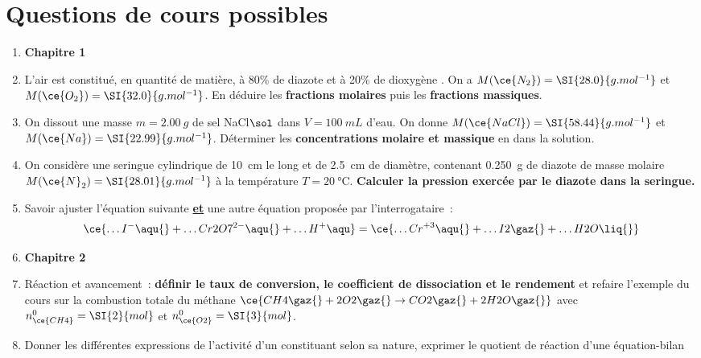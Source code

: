 \documentclass[a4paper, 12pt, final, garamond]{book}
\begin{document}
\section{Questions de cours possibles}
\begin{enumerate}
	\item[] \textbf{Chapitre 1}
	\item L'air est constitué, en quantité de matière, à 80\% de diazote  et
	      à 20\% de dioxygène .
	      \smallbreak
	      On a
	      $M(\ce{N_2}) = \SI{28.0}{g.mol^{-1}}$ et
	      $M(\ce{O_2}) = \SI{32.0}{g.mol^{-1}}$.
	      \smallbreak
	      En déduire les \textbf{fractions molaires} puis les \textbf{fractions
		      massiques}.
	\item On dissout une masse $m = \SI{2.00}{g}$ de sel NaCl$\sol$ dans $V =
		      \SI{100}{mL}$ d'eau.
	      \smallbreak
	      On donne
	      $M(\ce{NaCl}) = \SI{58.44}{g.mol^{-1}}$ et
	      $M(\ce{Na}) = \SI{22.99}{g.mol^{-1}}$.
	      \smallbreak
	      Déterminer les \textbf{concentrations molaire et massique} en
	       dans la solution.
	\item On considère une seringue cylindrique de \SI{10}{cm} le long et de
	      \SI{2.5}{cm} de diamètre, contenant \SI{0.250}{g} de diazote de masse
	      molaire $M({\ce{N}}_2) = \SI{28.01}{g.mol^{-1}}$ à la température $T =
		      \SI{20}{\degreeCelsius}$. \textbf{Calculer la pression exercée par le
		      diazote dans la seringue.}
	\item Savoir ajuster l'équation suivante \textbf{\underline{et}} une autre
	      équation proposée par l'interrogataire~:
	      \begin{gather*}
		      \ce{\ldots I^-\aqu{} + \ldots Cr2O7^{2-}\aqu{} + \ldots H^{+}\aqu}
		      =
		      \ce{\ldots Cr^{+3}\aqu{} + \ldots I2\gaz{} + \ldots H2O\liq{}}
	      \end{gather*}
	\item[] \textbf{Chapitre 2}
	\item Réaction et avancement~: \textbf{définir le taux de conversion,
		      le coefficient de dissociation et le rendement} et refaire l'exemple
	      du cours sur la combustion totale du méthane $\ce{CH4\gaz{} +
			      2O2\gaz{} \rightarrow CO2\gaz{} + 2H2O\gaz{}}$ avec $n_{\ce{CH4}}^0 =
		      \SI{2}{mol}$ et $n_{\ce{O2}}^0 = \SI{3}{mol}$.
	\item Donner les différentes expressions de l'activité d'un constituant
	      selon sa nature, exprimer le quotient de réaction d'une équation-bilan

\end{enumerate}
\end{document}
